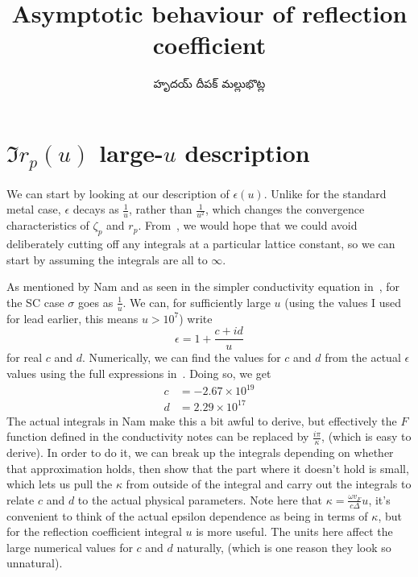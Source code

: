 \documentclass[../main.tex]{subfiles}
\title{Asymptotic behaviour of reflection coefficient}
\author{\begin{telugu}హృదయ్ దీపక్ మల్లుభొట్ల\end{telugu}}
\date{}
\begin{document}
	\graphicspath{{\main/figures/}}

	\onlyinsubfile{\maketitle}

	\section{$\Im r_p(u)$ large-$u$ description} \label{sec:imrpasymptotic}

	We can start by looking at our description of $\epsilon(u)$.
	Unlike for the standard metal case, $\epsilon$ decays as $\frac{1}{u}$, rather than $\frac{1}{u^2}$, which changes the convergence characteristics of $\zeta_p$ and $r_p$.
	From~\cite{Churchill2016}, we would hope that we could avoid deliberately cutting off any integrals at a particular lattice constant, so we can start by assuming the integrals are all to $\infty$.

	As mentioned by Nam\cite{Nam1967} and as seen in the simpler conductivity equation in~\cite{AGD}, for the SC case $\sigma$ goes as $\frac1u$.
	We can, for sufficiently large $u$ (using the values I used for lead earlier, this means $u > 10^7$) write
	\begin{equation}
		\epsilon = 1 + \frac{c + i d}{u} \label{eq:epsansatz}
	\end{equation}
	for real $c$ and $d$.
	Numerically, we can find the values for $c$ and $d$ from the actual $\epsilon$ values using the full expressions in~\cite{Nam1967}.
	Doing so, we get
	\begin{align}
		c &= -2.67 \times 10^{19} \\
		d &= 2.29 \times 10^{17}
	\end{align}
	The actual integrals in Nam make this a bit awful to derive, but effectively the $F$ function defined in the conductivity notes can be replaced by $\frac{i \pi}{\kappa}$, (which is easy to derive).
	In order to do it, we can break up the integrals depending on whether that approximation holds, then show that the part where it doesn't hold is small, which lets us pull the $\kappa$ from outside of the integral and carry out the integrals to relate $c$ and $d$ to the actual physical parameters.
	Note here that $\kappa = \frac{\omega v_F}{c \Delta} u$, it's convenient to think of the actual epsilon dependence as being in terms of $\kappa$, but for the reflection coefficient integral $u$ is more useful.
	The units here affect the large numerical values for $c$ and $d$ naturally, (which is one reason they look so unnatural).
\end{document}

